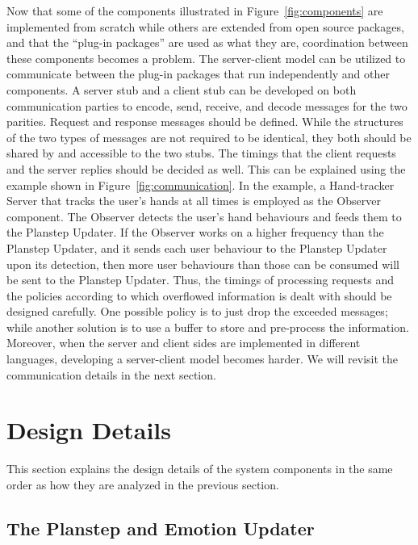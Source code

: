 Now that some of the components illustrated in Figure~\ref{fig:components} are implemented from scratch while others are extended from open source packages, and that the ``plug-in packages'' are used as what they are, coordination between these components becomes a problem. The server-client model can be utilized to communicate between the plug-in packages that run independently and other components. A server stub and a client stub can be developed on both communication parties to encode, send, receive, and decode messages for the two parities. Request and response messages should be defined. While the structures of the two types of messages are not required to be identical, they both should be shared by and accessible to the two stubs. The timings that the client requests and the server replies should be decided as well. This can be explained using the example shown in Figure~\ref{fig:communication}. In the example, a Hand-tracker Server that tracks the user's hands at all times is employed as the Observer component. The Observer detects the user's hand behaviours and feeds them to the Planstep Updater. If the Observer works on a higher frequency than the Planstep Updater, and it sends each user behaviour to the Planstep Updater upon its detection, then more user behaviours than those can be consumed will be sent to the Planstep Updater. Thus, the timings of processing requests and the policies according to which overflowed information is dealt with should be designed carefully. One possible policy is to just drop the exceeded messages; while another solution is to use a buffer to store and pre-process the information. Moreover, when the server and client sides are implemented in different languages, developing a server-client model becomes harder. We will revisit the communication details in the next section.

\section{Design Details}
\label{sec:design-details}

This section explains the design details of the system components in the same order as how they are analyzed in the previous section.

\subsection{The Planstep and Emotion Updater}

